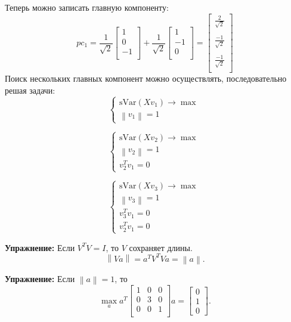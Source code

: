 \documentclass[12pt]{article} %
\theoremstyle{definition} %
\begin{document}
Теперь можно записать главную компоненту:
$$pc_1 =
\frac{1}{\sqrt{2}} \begin{bmatrix}
1\\
0\\
-1\\
\end{bmatrix}
+
\frac{1}{\sqrt{2}} \begin{bmatrix}
1\\
-1\\
0\\
\end{bmatrix}
=
\begin{bmatrix}
\frac{2}{\sqrt{2}}\\~\\
\frac{-1}{\sqrt{2}}\\~\\
\frac{-1}{\sqrt{2}}\\
\end{bmatrix}
$$
Поиск нескольких главных компонент можно осуществлять, последовательно решая задачи:
$$
\begin{cases}
\text{sVar}(Xv_1) \to \max \\
\left\| v_1 \right\| = 1
\end{cases}
$$

$$
\begin{cases}
\text{sVar}(Xv_2) \to \max \\
\left\| v_2 \right\| = 1 \\
v_2^Tv_1 = 0
\end{cases}
$$

$$
\begin{cases}
\text{sVar}(Xv_3) \to \max \\
\left\| v_3 \right\| = 1 \\
v_3^Tv_1 = 0\\
v_2^Tv_1 = 0
\end{cases}
$$

\textbf{Упражнение:} Если $V^TV=I$, то $V$ сохраняет длины.
$$\left\| Va \right\| = a^TV^TVa = \left\| a \right\|.$$

\textbf{Упражнение:} Если $\left\| a \right\| = 1$,
то
$$\max_a a^T
\begin{bmatrix}
1 & 0 & 0 \\
0 & 3 & 0 \\
0 & 0 & 1 \\
\end{bmatrix}
a =
\begin{bmatrix}
0\\
1\\
0
\end{bmatrix}.
$$
\end{document}

